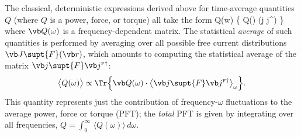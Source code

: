 \documentclass[letterpaper]{article}
\newcommand{\fd}{^{\text{\tiny{F}}\dagger}}
\begin{document}
The classical, deterministic expressions derived above for 
time-average quantities $Q$ (where $Q$ is a power, force,
or torque) all take the form
{Q(w) 
   \propto 
   \Tr \Big\{ \vb Q(\omega) \cdot \big(\vb j \vb j\fd\big) \Big\}
}
where $\vb Q(\omega)$ is a frequency-dependent matrix. The
statistical \textit{average} of such quantities is performed
by averaging over all possible free current distributions
$\vb J\supt{F}(\vb r)$, which amounts to computing the statistical
average of the matrix $\vb j\supt{F} \vb j\fd$:
\begin{align*}
 \big\langle Q(\omega) \big\rangle
   \propto 
   \Tr \Big\{ \vb Q(\omega) \cdot 
              \big\langle \vb j\supt{F} \vb j\fd\big\rangle_{\omega} 
       \Big\}.
\end{align*}
This quantity represents just the contribution of frequency-$\omega$
fluctuations to the average power, force or torque (PFT); the  
\textit{total} PFT is given by integrating over all frequencies,
$ Q=\int_{0}^\infty \, \langle Q(\omega) \rangle \,d\omega.$
\end{document}
